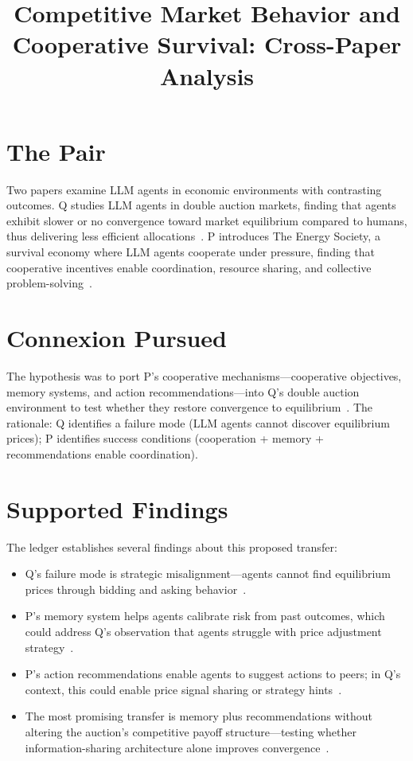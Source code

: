 \documentclass{article}
\title{Competitive Market Behavior and Cooperative Survival: Cross-Paper Analysis}
\begin{document}
\section*{The Pair}

Two papers examine LLM agents in economic environments with contrasting outcomes. Q studies LLM agents in double auction markets, finding that agents exhibit slower or no convergence toward market equilibrium compared to humans, thus delivering less efficient allocations~. P introduces The Energy Society, a survival economy where LLM agents cooperate under pressure, finding that cooperative incentives enable coordination, resource sharing, and collective problem-solving~.

\section*{Connexion Pursued}

The hypothesis was to port P's cooperative mechanisms---cooperative objectives, memory systems, and action recommendations---into Q's double auction environment to test whether they restore convergence to equilibrium~. The rationale: Q identifies a failure mode (LLM agents cannot discover equilibrium prices); P identifies success conditions (cooperation + memory + recommendations enable coordination).

\section*{Supported Findings}

The ledger establishes several findings about this proposed transfer:

\begin{itemize}
  \item Q's failure mode is strategic misalignment---agents cannot find equilibrium prices through bidding and asking behavior~.
  \item P's memory system helps agents calibrate risk from past outcomes, which could address Q's observation that agents struggle with price adjustment strategy~.
  \item P's action recommendations enable agents to suggest actions to peers; in Q's context, this could enable price signal sharing or strategy hints~.
  \item The most promising transfer is memory plus recommendations without altering the auction's competitive payoff structure---testing whether information-sharing architecture alone improves convergence~.
\end{itemize}
\end{document}
